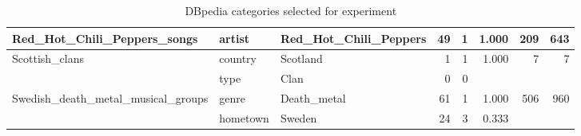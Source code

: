 \begin{table}[]
{\begin{tabular}{|l|l|l|r|r|r|r|r|}
Red\_Hot\_Chili\_Peppers\_songs & artist & Red\_Hot\_Chili\_Peppers & 49 & 1 & 1.000 & 209 & 643 \\ \hline
\multirow{2}{*}{Scottish\_clans} & country & Scotland & 1 & 1 & 1.000 & \multirow{2}{*}{7} & \multirow{2}{*}{7} \\ \cline{2-6}
 & type & Clan & 0 & 0 & \multicolumn{1}{l|}{} &  &  \\ \hline
\multirow{2}{*}{Swedish\_death\_metal\_musical\_groups} & genre & Death\_metal & 61 & 1 & 1.000 & \multirow{2}{*}{506} & \multirow{2}{*}{960} \\ \cline{2-6}
 & hometown & Sweden & 24 & 3 & 0.333 &  &  \\ \hline
\end{tabular}%
}
\caption{DBpedia categories selected for experiment}
\label{tab:dbpedia_categories}
\end{table}


